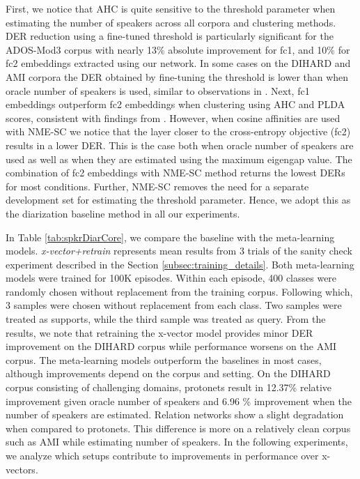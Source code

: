 First, we notice that AHC is quite sensitive to the threshold parameter when estimating the number of speakers across all corpora and clustering methods. DER reduction using a fine-tuned threshold is particularly significant for the ADOS-Mod3 corpus with nearly 13\% absolute improvement for fc1, and 10\% for fc2 embeddings extracted using our network. 
In some cases on the DIHARD and AMI corpora the DER obtained by fine-tuning the threshold is lower than when oracle number of speakers is used, similar to observations in \cite{pal_clusterGAN2020}.
Next, fc1 embeddings outperform fc2 embeddings when clustering using AHC and PLDA scores, consistent with findings from \cite{snyder_xvec2017}. However, when cosine affinities are used with NME-SC we notice that the layer closer to the cross-entropy objective (fc2) results in a lower DER. This is the case both when oracle number of speakers are used as well as when they are estimated using the maximum eigengap value. The combination of fc2 embeddings with NME-SC method returns the lowest DERs for most conditions. Further, NME-SC removes the need for a separate development set for estimating the threshold parameter. Hence, we adopt this as the diarization baseline method in all our experiments.

In Table \ref{tab:spkrDiarCore}, we compare the baseline with the meta-learning models. \textit{x-vector+retrain} represents mean results from 3 trials of the sanity check experiment described in the Section \ref{subsec:training_details}. Both meta-learning models were trained for 100K episodes. Within each episode, 400 classes were randomly chosen without replacement from the training corpus. Following which, 3 samples were chosen without replacement from each class. Two samples were treated as supports, while the third sample was treated as query. 
From the results, we note that retraining the x-vector model provides minor DER improvement on the DIHARD corpus while performance worsens on the AMI corpus. The meta-learning models outperform the baselines in most cases, although improvements depend on the corpus and setting. On the DIHARD corpus consisting of challenging domains, protonets result in 12.37\% relative improvement given oracle number of speakers and 6.96 \% improvement when the number of speakers are estimated. Relation networks show a slight degradation when compared to protonets. This difference is more on a relatively clean corpus such as AMI while estimating number of speakers. 
In the following experiments, we analyze which setups contribute to improvements in performance over x-vectors.


